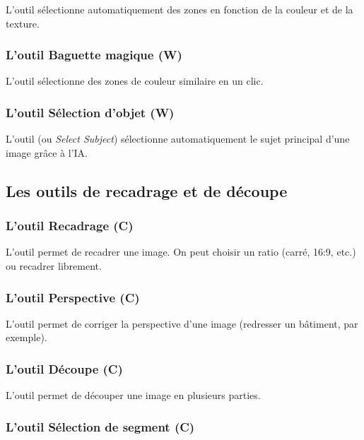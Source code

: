 L'outil  sélectionne automatiquement des zones en fonction de la couleur et de la texture.

\subsubsection{L'outil Baguette magique (W)}

L'outil  sélectionne des zones de couleur similaire en un clic.

\subsubsection{L'outil Sélection d'objet (W)}

L'outil  (ou \emph{Select Subject}) sélectionne automatiquement le sujet principal d'une image grâce à l'IA.

\subsection{Les outils de recadrage et de découpe}

\subsubsection{L'outil Recadrage (C)}

L'outil  permet de recadrer une image. On peut choisir un ratio (carré, 16:9, etc.) ou recadrer librement.

\subsubsection{L'outil Perspective (C)}

L'outil  permet de corriger la perspective d'une image (redresser un bâtiment, par exemple).

\subsubsection{L'outil Découpe (C)}

L'outil  permet de découper une image en plusieurs parties.

\subsubsection{L'outil Sélection de segment (C)}

